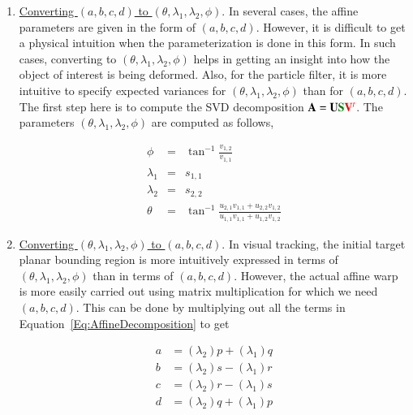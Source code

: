 \begin{Body}
\begin{enumerate} 
\item \underline{Converting $(a, b, c, d)$ to $(\theta, \lambda_1, \lambda_2, \phi)$}.  In several cases, the affine parameters are given in the form of $(a, b, c, d)$.  However, it is difficult to get a physical intuition when the parameterization is done in this form.  In such cases, converting to $(\theta, \lambda_1, \lambda_2, \phi)$ helps in getting an insight into how the object of interest is being deformed.  Also, for the particle filter, it is more intuitive to specify expected variances for $(\theta, \lambda_1, \lambda_2, \phi)$ than for $(a, b, c, d)$.  The first step here is to compute the SVD decomposition $\mathbf{A}=\mathbf{U}{\color{darkgreen}\mathbf{S}}{\color{red}\mathbf{V}^t}$.  The parameters $(\theta, \lambda_1, \lambda_2, \phi)$ are computed as follows,

\begin{equation}
\boxed{
\begin{array}{llll}
\phi &=& \tan^{-1}\frac{v_{1,2}}{v_{1,1}}\\
\lambda_1 &=&  s_{1,1}\\
\lambda_2 &=& s_{2,2}\\
\theta &=& \tan^{-1}\frac{u_{2,1}v_{1,1} + u_{2,2}v_{1,2}}{u_{1,1}v_{1,1} + u_{1,2}v_{1,2}}
\end{array}}
\end{equation}

\item \underline{Converting  $(\theta, \lambda_1, \lambda_2, \phi)$ to $(a, b, c, d)$}.  In visual tracking, the initial target planar bounding region is more intuitively expressed in terms of $(\theta, \lambda_1, \lambda_2, \phi)$ than in terms of $(a, b, c, d)$.  However, the actual affine warp is more easily carried out using matrix multiplication for which we need $(a, b, c, d)$.  This can be done by multiplying out all the terms in Equation~\ref{Eq:AffineDecomposition} to get

\begin{equation}
\boxed{
\begin{array}{llll}
a &= (\lambda_2) p + (\lambda_1) q\\
b &= (\lambda_2) s  - (\lambda_1) r \\
c &= (\lambda_2) r  - (\lambda_1) s \\
d &= (\lambda_2)q + (\lambda_1) p
\end{array}}
\label{Eqn:tllpxy_to_abcdxy}
\end{equation}


\end{enumerate}
\end{Body}
